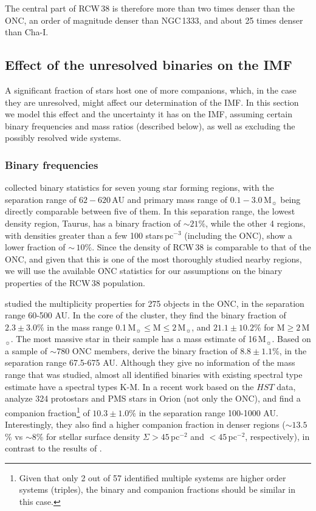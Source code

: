 \documentclass[a4paper,fleqn,usenatbib]{mnras}
\begin{document}
The central part of RCW\,38 is therefore more than two times denser than the ONC, an order of magnitude denser than NGC\,1333, and about 25 times denser than Cha-I.

\subsection{Effect of the unresolved binaries on the IMF}
\label{binaries}
A significant fraction of stars host one of more companions, which, in the case they are 
unresolved, might affect our determination of the IMF. In this section we
 model this effect and the uncertainty it has on the IMF, assuming certain
binary frequencies and mass ratios (described below), as well as excluding the possibly resolved wide systems. 

\subsubsection{Binary frequencies}
\citet{king12a,king12b} collected binary statistics for seven young star forming regions, with the separation range of $62-620\,$AU
and primary mass range of $0.1 - 3.0\,$M$_{\sun}$ 
being directly comparable between five of them. In this separation range, the lowest 
density region, Taurus, has a binary fraction of $\sim 21\%$, while 
the other 4 regions, with densities greater than a few 100 stars\,pc$^{-3}$ (including the ONC), show a lower fraction of $\sim\,10\%$.
Since the density of RCW\,38 is comparable to that of the ONC, and given that this is one of the most thoroughly studied nearby regions, 
we will use the available ONC statistics for our assumptions on the binary properties of the RCW\,38 population. 

\citet{koehler06} studied the multiplicity properties for 275 objects in the ONC, in the separation range 60-500 AU. 
In the core of the cluster, they find the binary fraction of $2.3\pm3.0 \%$ in the mass range 0.1\,M$_{\sun}\leq$M$\leq2\,$M$_{\sun}$,
and $21.1\pm10.2 \%$ for M$\geq 2\,$M$_{\sun}$. The most massive star in their sample has a mass estimate of 16\,M$_{\sun}$.
Based on a sample of $\sim780$ ONC members, \citet{reipurth07} derive the binary fraction of $8.8\pm1.1 \%$, in  
the separation range 67.5-675 AU. Although they give no information of the mass range that was studied, almost all
identified binaries with existing spectral type estimate have a spectral types K-M.
In a recent work based on the $HST$ data, \citet{kounkel16b} analyze 324 protostars and PMS stars in Orion (not only the ONC), 
and find a companion fraction\footnote{Given that only 2 out of 57 identified multiple systems are higher order systems (triples), 
the binary and companion fractions should be similar in this case.} of $10.3\pm1.0\%$ in the separation range 100-1000 AU. Interestingly, 
they also find a higher companion fraction in denser regions ($\sim 13.5$\% vs $\sim 8$\% for stellar surface density $\Sigma > 45\,$pc$^{-2}$ and $< 45\,$pc$^{-2}$, respectively),  
in contrast to the results of \citet{koehler06}.
\end{document}

